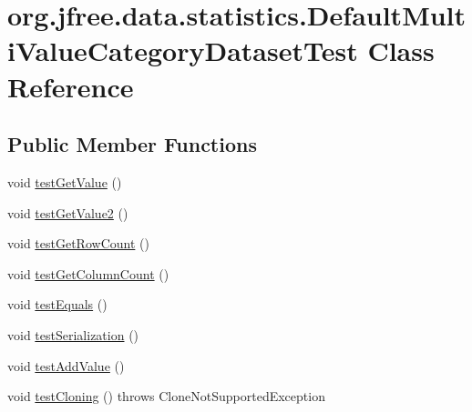 \hypertarget{classorg_1_1jfree_1_1data_1_1statistics_1_1_default_multi_value_category_dataset_test}{}\section{org.\+jfree.\+data.\+statistics.\+Default\+Multi\+Value\+Category\+Dataset\+Test Class Reference}
\label{classorg_1_1jfree_1_1data_1_1statistics_1_1_default_multi_value_category_dataset_test}
\subsection*{Public Member Functions}
\begin{DoxyCompactItemize}
\item 
void \mbox{\hyperlink{classorg_1_1jfree_1_1data_1_1statistics_1_1_default_multi_value_category_dataset_test_aed4395cf3ada5c9b7fdae19945cb8f8b}{test\+Get\+Value}} ()
\item 
void \mbox{\hyperlink{classorg_1_1jfree_1_1data_1_1statistics_1_1_default_multi_value_category_dataset_test_a87230bab4b1a08cdeb72e9607bcef4a6}{test\+Get\+Value2}} ()
\item 
void \mbox{\hyperlink{classorg_1_1jfree_1_1data_1_1statistics_1_1_default_multi_value_category_dataset_test_a189e3b8bc4609f6147a85c2725623246}{test\+Get\+Row\+Count}} ()
\item 
void \mbox{\hyperlink{classorg_1_1jfree_1_1data_1_1statistics_1_1_default_multi_value_category_dataset_test_a03295f300e86247973e925732b5ba7db}{test\+Get\+Column\+Count}} ()
\item 
void \mbox{\hyperlink{classorg_1_1jfree_1_1data_1_1statistics_1_1_default_multi_value_category_dataset_test_a133125de49fdb84032b3c317049dfd14}{test\+Equals}} ()
\item 
void \mbox{\hyperlink{classorg_1_1jfree_1_1data_1_1statistics_1_1_default_multi_value_category_dataset_test_a4828924c5566c5f8807c7e5b45c61319}{test\+Serialization}} ()
\item 
void \mbox{\hyperlink{classorg_1_1jfree_1_1data_1_1statistics_1_1_default_multi_value_category_dataset_test_a50270a790f56a23b5f4643cef35c503b}{test\+Add\+Value}} ()
\item 
void \mbox{\hyperlink{classorg_1_1jfree_1_1data_1_1statistics_1_1_default_multi_value_category_dataset_test_a335526b58e89843f38004be6788b6c80}{test\+Cloning}} ()  throws Clone\+Not\+Supported\+Exception 
\end{DoxyCompactItemize}


